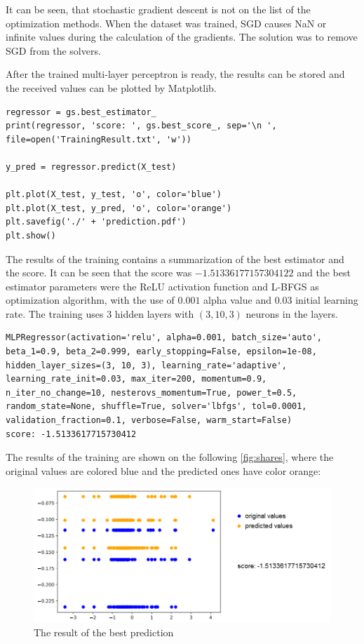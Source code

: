 It can be seen, that stochastic gradient descent is not on the list of the optimization methods. When the dataset was trained, SGD causes NaN or infinite values during the calculation of the gradients. The solution was to remove SGD from the solvers. \medskip

After the trained multi-layer perceptron is ready, the results can be stored and the received values can be plotted by Matplotlib.
\begin{lstlisting}
regressor = gs.best_estimator_
print(regressor, 'score: ', gs.best_score_, sep='\n ', file=open('TrainingResult.txt', 'w'))

y_pred = regressor.predict(X_test)

plt.plot(X_test, y_test, 'o', color='blue')
plt.plot(X_test, y_pred, 'o', color='orange')
plt.savefig('./' + 'prediction.pdf')
plt.show()
\end{lstlisting}
The results of the training contains a summarization of the best estimator and the score. It can be seen that the score was $-1.51336177157304122$ and the best estimator parameters were the ReLU activation function and L-BFGS as optimization algorithm, with the use of $0.001$ alpha value and $0.03$ initial learning rate. The training uses $3$ hidden layers with $(3,10,3)$ neurons in the layers.
\begin{lstlisting}
MLPRegressor(activation='relu', alpha=0.001, batch_size='auto', beta_1=0.9, beta_2=0.999, early_stopping=False, epsilon=1e-08, hidden_layer_sizes=(3, 10, 3), learning_rate='adaptive', learning_rate_init=0.03, max_iter=200, momentum=0.9, n_iter_no_change=10, nesterovs_momentum=True, power_t=0.5, random_state=None, shuffle=True, solver='lbfgs', tol=0.0001, validation_fraction=0.1, verbose=False, warm_start=False)
score: -1.5133617715730412
\end{lstlisting}

\smallskip The results of the training are shown on the following \autoref{fig:shares}, where the original values are colored blue and the predicted ones have color orange:
\begin{figure}[h]
	\centering
	\includegraphics[height=0.38\linewidth]{./figures/prediction}
	\caption{The result of the best prediction}
	\label{fig:shares}
\end{figure}


